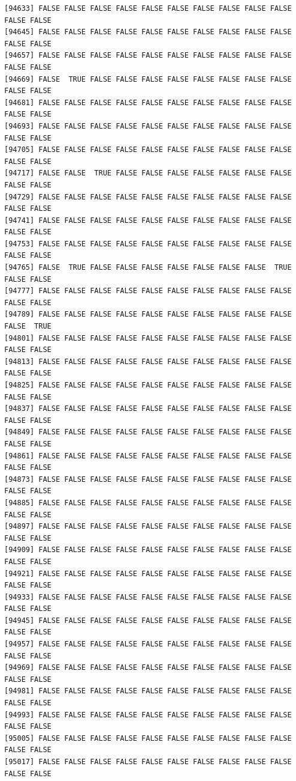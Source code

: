 \documentclass[
  a4paper,
  DIV=11,
  numbers=noendperiod]{scrartcl}
\begin{document}
\begin{verbatim}
[94633] FALSE FALSE FALSE FALSE FALSE FALSE FALSE FALSE FALSE FALSE FALSE FALSE
[94645] FALSE FALSE FALSE FALSE FALSE FALSE FALSE FALSE FALSE FALSE FALSE FALSE
[94657] FALSE FALSE FALSE FALSE FALSE FALSE FALSE FALSE FALSE FALSE FALSE FALSE
[94669] FALSE  TRUE FALSE FALSE FALSE FALSE FALSE FALSE FALSE FALSE FALSE FALSE
[94681] FALSE FALSE FALSE FALSE FALSE FALSE FALSE FALSE FALSE FALSE FALSE FALSE
[94693] FALSE FALSE FALSE FALSE FALSE FALSE FALSE FALSE FALSE FALSE FALSE FALSE
[94705] FALSE FALSE FALSE FALSE FALSE FALSE FALSE FALSE FALSE FALSE FALSE FALSE
[94717] FALSE FALSE  TRUE FALSE FALSE FALSE FALSE FALSE FALSE FALSE FALSE FALSE
[94729] FALSE FALSE FALSE FALSE FALSE FALSE FALSE FALSE FALSE FALSE FALSE FALSE
[94741] FALSE FALSE FALSE FALSE FALSE FALSE FALSE FALSE FALSE FALSE FALSE FALSE
[94753] FALSE FALSE FALSE FALSE FALSE FALSE FALSE FALSE FALSE FALSE FALSE FALSE
[94765] FALSE  TRUE FALSE FALSE FALSE FALSE FALSE FALSE FALSE  TRUE FALSE FALSE
[94777] FALSE FALSE FALSE FALSE FALSE FALSE FALSE FALSE FALSE FALSE FALSE FALSE
[94789] FALSE FALSE FALSE FALSE FALSE FALSE FALSE FALSE FALSE FALSE FALSE  TRUE
[94801] FALSE FALSE FALSE FALSE FALSE FALSE FALSE FALSE FALSE FALSE FALSE FALSE
[94813] FALSE FALSE FALSE FALSE FALSE FALSE FALSE FALSE FALSE FALSE FALSE FALSE
[94825] FALSE FALSE FALSE FALSE FALSE FALSE FALSE FALSE FALSE FALSE FALSE FALSE
[94837] FALSE FALSE FALSE FALSE FALSE FALSE FALSE FALSE FALSE FALSE FALSE FALSE
[94849] FALSE FALSE FALSE FALSE FALSE FALSE FALSE FALSE FALSE FALSE FALSE FALSE
[94861] FALSE FALSE FALSE FALSE FALSE FALSE FALSE FALSE FALSE FALSE FALSE FALSE
[94873] FALSE FALSE FALSE FALSE FALSE FALSE FALSE FALSE FALSE FALSE FALSE FALSE
[94885] FALSE FALSE FALSE FALSE FALSE FALSE FALSE FALSE FALSE FALSE FALSE FALSE
[94897] FALSE FALSE FALSE FALSE FALSE FALSE FALSE FALSE FALSE FALSE FALSE FALSE
[94909] FALSE FALSE FALSE FALSE FALSE FALSE FALSE FALSE FALSE FALSE FALSE FALSE
[94921] FALSE FALSE FALSE FALSE FALSE FALSE FALSE FALSE FALSE FALSE FALSE FALSE
[94933] FALSE FALSE FALSE FALSE FALSE FALSE FALSE FALSE FALSE FALSE FALSE FALSE
[94945] FALSE FALSE FALSE FALSE FALSE FALSE FALSE FALSE FALSE FALSE FALSE FALSE
[94957] FALSE FALSE FALSE FALSE FALSE FALSE FALSE FALSE FALSE FALSE FALSE FALSE
[94969] FALSE FALSE FALSE FALSE FALSE FALSE FALSE FALSE FALSE FALSE FALSE FALSE
[94981] FALSE FALSE FALSE FALSE FALSE FALSE FALSE FALSE FALSE FALSE FALSE FALSE
[94993] FALSE FALSE FALSE FALSE FALSE FALSE FALSE FALSE FALSE FALSE FALSE FALSE
[95005] FALSE FALSE FALSE FALSE FALSE FALSE FALSE FALSE FALSE FALSE FALSE FALSE
[95017] FALSE FALSE FALSE FALSE FALSE FALSE FALSE FALSE FALSE FALSE FALSE FALSE

\end{verbatim}
\end{document}
